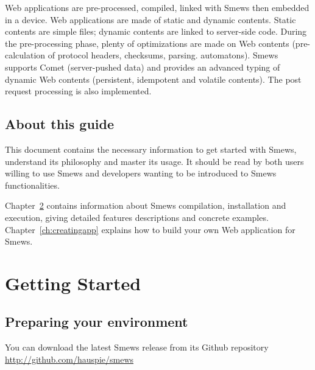 \documentclass{report}
\newcommand{\rchap}[1]{Chapter~\ref{ch:#1}}
\begin{document}
Web applications are pre-processed, compiled, linked with Smews then embedded in a device. Web applications are made of static and dynamic contents. Static contents are simple files; dynamic contents are linked to server-side code. During the pre-processing phase, plenty of optimizations are made on Web contents (pre-calculation of protocol headers, checksums, parsing. automatons). Smews supports Comet (server-pushed data) and provides an advanced typing of dynamic Web contents (persistent, idempotent and volatile contents). The post request processing is also implemented.

\section{About this guide}

This document contains the necessary information to get started with Smews, understand its philosophy and master its usage. It should be read by both users willing to use Smews and developers wanting to be introduced to Smews functionalities.

\rchap{gettingstarted} contains information about Smews compilation, installation and execution, giving detailed features descriptions and concrete examples. \rchap{creatingapp} explains how to build your own Web application for Smews.

\chapter{Getting Started}
\label{ch:gettingstarted}

\section{Preparing your environment}

You can download the latest Smews release from its Github repository \url{http://github.com/hauspie/smews}
\end{document}
